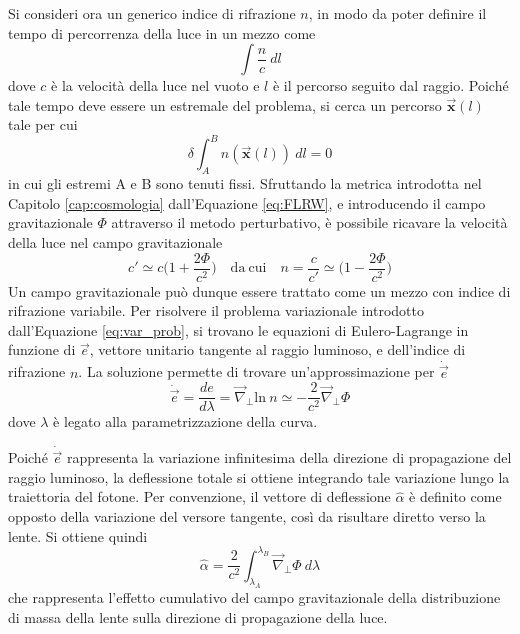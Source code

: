 Si consideri ora un generico indice di rifrazione $n$, in modo da poter definire il tempo di percorrenza della luce in un mezzo come
\begin{equation}
    \int \frac{n}{c}\ dl
\end{equation}
dove $c$ è la velocità della luce nel vuoto e $l$ è il percorso seguito dal raggio.
Poiché tale tempo deve essere un estremale del problema, si cerca un percorso $\vec{\boldsymbol{x}}(l)$ tale per cui 
\begin{equation}
   \delta \int_A^B n(\vec{\boldsymbol{x}}(l))\ dl =0
   \label{eq:var_prob}
\end{equation}
in cui gli estremi A e B sono tenuti fissi. 
Sfruttando la metrica introdotta nel Capitolo \ref{cap:cosmologia} dall'Equazione \ref{eq:FLRW}, e introducendo il campo gravitazionale $\Phi$ attraverso il metodo perturbativo, è possibile ricavare la velocità della luce nel campo gravitazionale 
\begin{equation}
    c'\simeq c\Big(1+\frac{2\Phi}{c^2}\Big) \quad \mathrm{da\ cui} \quad n = \frac{c}{c'}\simeq \Big(1-\frac{2\Phi}{c^2}\Big)
\end{equation}
Un campo gravitazionale può dunque essere trattato come un mezzo con indice di rifrazione variabile.
Per risolvere il problema variazionale introdotto dall'Equazione \ref{eq:var_prob}, si trovano le equazioni di Eulero-Lagrange in funzione di $\vec e$, vettore unitario tangente al raggio luminoso, e dell'indice di rifrazione $n$. La soluzione permette di trovare un'approssimazione per $\dot{\vec e}$
\begin{equation}
    \dot{\vec e}=\frac{de}{d\lambda}= \vec \nabla_\perp \mathrm{ln}\ n \simeq -\frac{2}{c^2}\vec \nabla_\perp \Phi
\end{equation}
dove $\lambda$ è legato alla parametrizzazione della curva.

Poiché $\dot{\vec e}$ rappresenta la variazione infinitesima della direzione di propagazione del raggio luminoso, la deflessione totale si ottiene integrando tale variazione lungo la traiettoria del fotone. Per convenzione, il vettore di deflessione $\hat \alpha$
 è definito come opposto della variazione del versore tangente, così da risultare diretto verso la lente. Si ottiene quindi
 \begin{equation}
     \hat \alpha =\frac{2}{c^2}\int_{\lambda_A}^{\lambda_B}\vec \nabla_\perp \Phi \ d\lambda
 \end{equation}
che rappresenta l'effetto cumulativo del campo gravitazionale della distribuzione di massa della lente sulla direzione di propagazione della luce.

